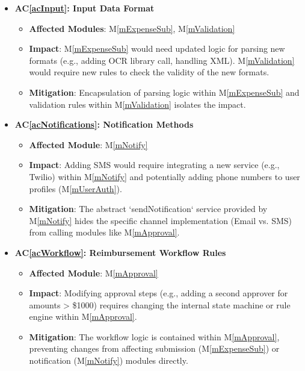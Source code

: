 \documentclass[12pt, titlepage]{article}
\newcommand{\acref}[1]{AC\ref{#1}}
\newcommand{\mref}[1]{M\ref{#1}}
\begin{document}
\begin{itemize}
    \item \textbf{\acref{acInput}: Input Data Format}
    \begin{itemize}
        \item \textbf{Affected Modules}: \mref{mExpenseSub}, \mref{mValidation}
        \item \textbf{Impact}: \mref{mExpenseSub} would need updated logic for parsing new formats (e.g., adding OCR library call, handling XML). \mref{mValidation} would require new rules to check the validity of the new formats.
        \item \textbf{Mitigation}: Encapsulation of parsing logic within \mref{mExpenseSub} and validation rules within \mref{mValidation} isolates the impact.
    \end{itemize}

    \item \textbf{\acref{acNotifications}: Notification Methods}
    \begin{itemize}
        \item \textbf{Affected Module}: \mref{mNotify}
        \item \textbf{Impact}: Adding SMS would require integrating a new service (e.g., Twilio) within \mref{mNotify} and potentially adding phone numbers to user profiles (\mref{mUserAuth}).
        \item \textbf{Mitigation}: The abstract `sendNotification` service provided by \mref{mNotify} hides the specific channel implementation (Email vs. SMS) from calling modules like \mref{mApproval}.
    \end{itemize}

    \item \textbf{\acref{acWorkflow}: Reimbursement Workflow Rules}
    \begin{itemize}
        \item \textbf{Affected Module}: \mref{mApproval}
        \item \textbf{Impact}: Modifying approval steps (e.g., adding a second approver for amounts > \$1000) requires changing the internal state machine or rule engine within \mref{mApproval}.
        \item \textbf{Mitigation}: The workflow logic is contained within \mref{mApproval}, preventing changes from affecting submission (\mref{mExpenseSub}) or notification (\mref{mNotify}) modules directly.
    \end{itemize}


\end{itemize}
\end{document}

